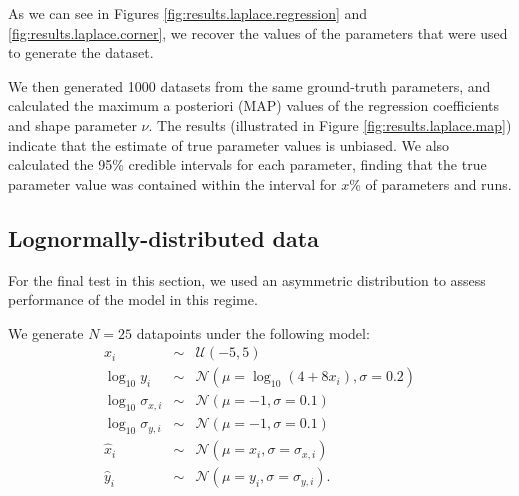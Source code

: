 \documentclass[fleqn,usenatbib]{mnras}
\begin{document}


As we can see in Figures \ref{fig:results.laplace.regression} and
\ref{fig:results.laplace.corner}, we recover the values of the parameters that were
used to generate the dataset.

We then generated 1000 datasets from the same ground-truth parameters, and
calculated the maximum a posteriori (MAP) values of the regression coefficients
and shape parameter $\nu$. The results (illustrated in Figure
\ref{fig:results.laplace.map}) indicate that the estimate of true parameter values is
unbiased.{
\color{red} We also calculated the 95\% credible intervals for each parameter,
finding that the true parameter value was contained within the interval for
$x$\% of parameters and runs.
}



\subsection{Lognormally-distributed data}
\label{sec:results.lognormal}

For the final test in this section, we used an asymmetric distribution to assess
performance of the model in this regime.

We generate $N = 25$ datapoints under the following model:
\begin{eqnarray}
    x_i &\sim& \mathcal U (-5, 5) \\
    \log_{10} y_i &\sim& \mathcal N (\mu = \log_{10} (4 + 8 x_i), \sigma = 0.2) \\
    \log_{10} \sigma_{x, i} &\sim& \mathcal N (\mu = -1, \sigma = 0.1) \\
    \log_{10} \sigma_{y, i} &\sim& \mathcal N (\mu = -1, \sigma = 0.1) \\
    \hat{x}_i &\sim& \mathcal N (\mu = x_i, \sigma = \sigma_{x, i}) \\
    \hat{y}_i &\sim& \mathcal N (\mu = y_i, \sigma = \sigma_{y, i}).
\end{eqnarray}
\end{document}

